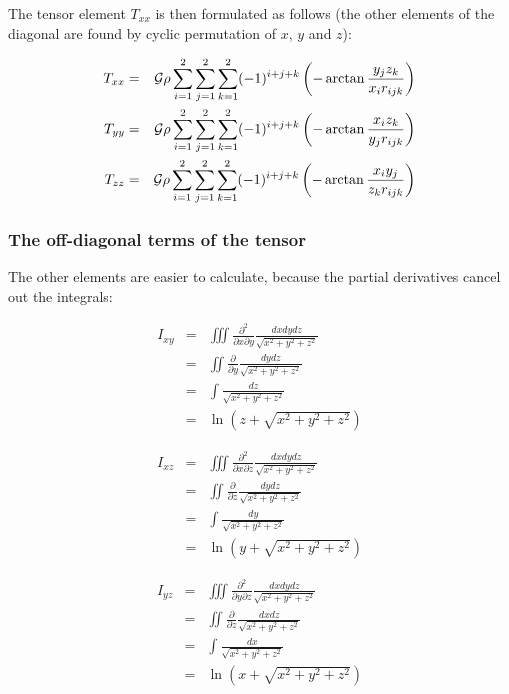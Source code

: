 The tensor element $T_{xx}$ is then formulated as follows 
(the other elements of the diagonal are found by cyclic permutation of $x$, $y$ and $z$):

\begin{mdframed}[backgroundcolor=blue!5]
\begin{eqnarray}
T_{xx} &=& {\cal G} \rho \sum_{i=1}^{2} \sum_{j=1}^{2} \sum_{k=1}^{2} (-1)^{i+j+k} 
\left( - \arctan{\frac{y_j z_k}{x_i r_{ijk}}} \right) \nonumber\\
T_{yy} &=& {\cal G} \rho \sum_{i=1}^{2} \sum_{j=1}^{2} \sum_{k=1}^{2} (-1)^{i+j+k} 
\left( - \arctan{\frac{x_i z_k}{y_j r_{ijk}}} \right) \nonumber\\
T_{zz} &=& {\cal G} \rho \sum_{i=1}^{2} \sum_{j=1}^{2} \sum_{k=1}^{2} (-1)^{i+j+k} 
\left( - \arctan{\frac{x_i y_j}{z_k r_{ijk}}} \right) \nonumber
\end{eqnarray}
\end{mdframed}

\subsubsection{The off-diagonal terms of the tensor}

The other elements are easier to calculate, because the partial derivatives cancel out the integrals:

\begin{eqnarray}
I_{xy} 
&=& \iiint \frac{\partial^2}{\partial x \partial y} \frac{dx dy dz}{\sqrt{x^2+y^2+z^2}} \nonumber\\
&=& \iint \frac{\partial}{\partial y} \frac{dy dz}{\sqrt{x^2+y^2+z^2}} \nonumber\\
&=& \int \frac{dz}{\sqrt{x^2+y^2+z^2}} \nonumber\\
&=& \ln{\left(z + \sqrt{x^2+y^2+z^2} \right)}
\end{eqnarray}

\begin{eqnarray}
I_{xz} 
&=& \iiint \frac{\partial^2}{\partial x \partial z} \frac{dx dy dz}{\sqrt{x^2+y^2+z^2}} \nonumber\\
&=& \iint \frac{\partial}{\partial z} \frac{dy dz}{\sqrt{x^2+y^2+z^2}} \nonumber\\
&=& \int \frac{dy}{\sqrt{x^2+y^2+z^2}} \nonumber\\
&=& \ln{\left(y + \sqrt{x^2+y^2+z^2} \right)}
\end{eqnarray}

\begin{eqnarray}
I_{yz} 
&=& \iiint \frac{\partial^2}{\partial y \partial z} \frac{dx dy dz}{\sqrt{x^2+y^2+z^2}} \nonumber\\
&=& \iint \frac{\partial}{\partial z} \frac{dx dz}{\sqrt{x^2+y^2+z^2}} \nonumber\\
&=& \int \frac{dx}{\sqrt{x^2+y^2+z^2}} \nonumber\\
&=& \ln{\left(x + \sqrt{x^2+y^2+z^2} \right)}
\end{eqnarray}

